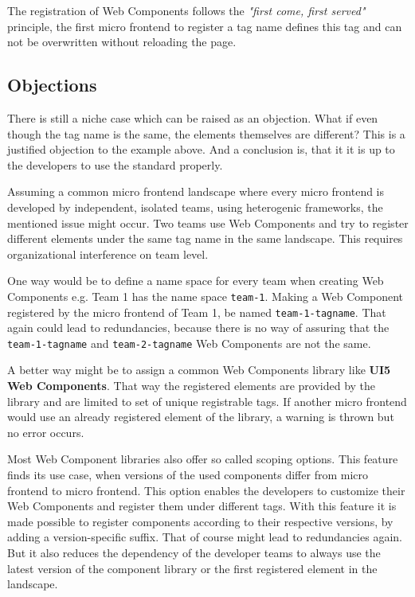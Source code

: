 The registration of Web Components follows the \textit{"first come, first served"} principle, the first micro frontend to register a tag name defines this tag and can not be overwritten without reloading the page.\cite{mdn_web_docs_define}

\subsection{Objections}

There is still a niche case which can be raised as an objection. What if even though the tag name is the same, the elements themselves are different? This is a justified objection to the example above. And a conclusion is, that it it is up to the developers to use the standard properly.

Assuming a common micro frontend landscape where every micro frontend is developed by independent, isolated teams, using heterogenic frameworks, the mentioned issue might occur. Two teams use Web Components and try to register different elements under the same tag name in the same landscape. This requires organizational interference on team level.

One way would be to define a name space for every team when creating Web Components e.g. Team 1 has the name space \texttt{team-1}. Making a Web Component registered by the micro frontend of Team 1, be named \texttt{team-1-tagname}. That again could lead to redundancies, because there is no way of assuring that the \texttt{team-1-tagname} and \texttt{team-2-tagname} Web Components are not the same.\cite{wc_best_practices}

A better way might be to assign a common Web Components library like \textbf{UI5 Web Components}. That way the registered elements are provided by the library and are limited to set of unique registrable tags. If another micro frontend would use an already registered element of the library, a warning is thrown but no error occurs.

Most Web Component libraries also offer so called scoping options. This feature finds its use case, when versions of the used components differ from micro frontend to micro frontend. This option enables the developers to customize their Web Components and register them under different tags. With this feature it is made possible to register components according to their respective versions, by adding a version-specific suffix. That of course might lead to redundancies again. But it also reduces the dependency of the developer teams to always use the latest version of the component library or the first registered element in the landscape. \cite{ui5_webcomponents_scoping} \cite{openwc_scoping}

